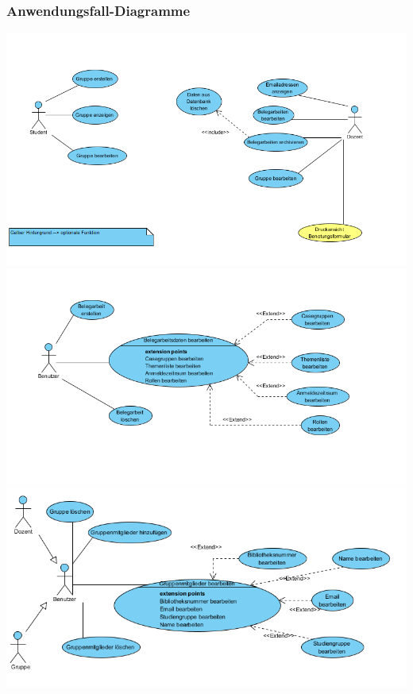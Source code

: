 \documentclass{article}
\begin{document}
\subsubsection{Anwendungsfall-Diagramme}
\begin{center}
\includegraphics[scale=1]{bilder/Uebersicht_UseCase.PNG}\\
\includegraphics[scale=1]{bilder/Belegarbeit_bearbeiten_UseCase.png}\\
\includegraphics[scale=1]{bilder/Gruppe_bearbeiten_UseCase.png}\\
\end{center}
\end{document}
